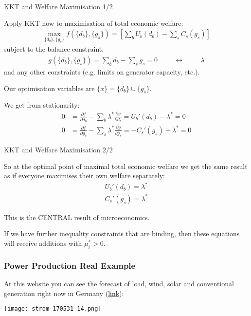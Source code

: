 \documentclass[10pt,aspectratio=169,dvipsnames]{beamer}
\def\l{\lambda}
\def\m{\mu}
\def\d{\partial}
\begin{document}
\begin{frame}{KKT and Welfare Maximisation 1/2}

  Apply KKT now to maximisation of total economic welfare:
  \begin{align*}
    \max_{\{d_b\}, \{g_s\}} f(\{d_b\}, \{g_s\}) = \left[ \sum_b U_b (d_b)  -  \sum_s C_s (g_s) \right]
  \end{align*}
  subject to the balance constraint:
  \begin{align*}
    g(\{d_b\}, \{g_s\}) = \sum_b d_b -  \sum_s g_s  = 0 \hspace{1cm} \leftrightarrow \hspace{1cm} \l
  \end{align*}
  and any other constraints (e.g. limits on generator capacity, etc.).

  Our optimisation variables are $\{x\} = \{d_b\} \cup \{g_s\}$.

  We get from stationarity:
  \begin{align*}
    0 & =   \frac{\d f}{\d d_b} - \sum_b \l^* \frac{\d g}{\d d_b} = U_b'(d_b) - \l^* = 0 \\
    0 & =   \frac{\d f}{\d g_s} - \sum_s \l^* \frac{\d g}{\d g_s} = -C_s'(g_s) + \l^* = 0
  \end{align*}


\end{frame}





\begin{frame}{KKT and Welfare Maximisation 2/2}

  So at the optimal point of maximal total economic welfare we get the
  same result as if everyone maximises their own welfare separately:
  \begin{align*}
 U_b'(d_b) =  \l^*  \\
 C_s'(g_s) = \l^*
  \end{align*}

  This is the CENTRAL result of microeconomics.

  If we have further inequality constraints that are binding, then
  these equations will receive additions with $\m_i^* > 0$.


\end{frame}



\begin{frame}[fragile]
  \frametitle{Power Production Real Example}

  At this website you can see the forecast of load, wind, solar and conventional generation right now in Germany (\href{https://energy-charts.de/power_de.htm}{link}):


  \centering
    \texttt{[image: strom-170531-14.png]}


\end{frame}
\end{document}
